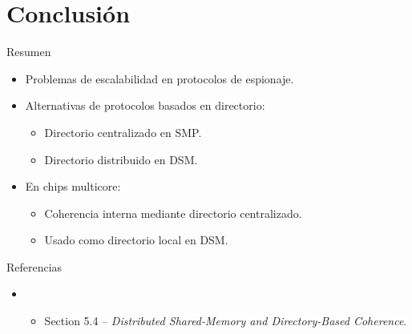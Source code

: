 \section{Conclusión}

\begin{frame}[t]{Resumen}
\begin{itemize}
  \item Problemas de escalabilidad en protocolos de espionaje.
  \item Alternativas de protocolos basados en directorio:
    \begin{itemize}
      \item Directorio centralizado en SMP.
      \item Directorio distribuido en DSM.
    \end{itemize}
  \item En chips multicore:
    \begin{itemize}
      \item Coherencia interna mediante directorio centralizado.
      \item Usado como directorio local en DSM.
    \end{itemize}
\end{itemize}
\end{frame}


\begin{frame}[t]{Referencias}
\begin{itemize}
  \item \bibhennessy
    \begin{itemize}
      \item Section 5.4 -- \emph{Distributed Shared-Memory and Directory-Based Coherence}.
    \end{itemize}

\end{itemize}
\end{frame}
